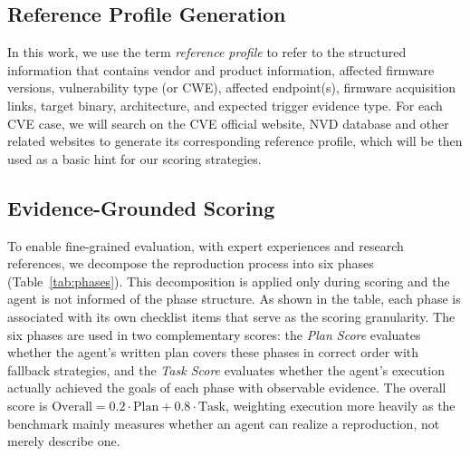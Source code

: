 \subsection{Reference Profile Generation}
\label{sec:dossier}

In this work, we use the term \textit{reference profile} to refer to the
structured information that contains vendor and product information, affected firmware versions, vulnerability type (or CWE), affected endpoint(s), firmware acquisition links, target binary, architecture, and expected trigger evidence type. For each CVE case, we will search on the CVE official website, NVD database and other related websites to generate its corresponding reference profile, which will be then used as a basic hint for our scoring strategies.

\subsection{Evidence-Grounded Scoring}
\label{sec:scoring}
To enable fine-grained evaluation, with expert experiences and research references, we decompose the reproduction process into six phases (Table~\ref{tab:phases}). 
This decomposition is applied only during scoring and the agent is not informed of the phase structure. 
As shown in the table, each phase is associated with its own checklist items that serve as the scoring granularity. 
The six phases are used in two complementary scores: the \emph{Plan Score} evaluates whether the agent's written plan covers these phases in correct order with fallback strategies, and the \emph{Task Score} evaluates whether the agent's execution actually achieved the goals of each phase with observable evidence. The overall score is $\text{Overall}=0.2\cdot\text{Plan}+0.8\cdot\text{Task}$, weighting execution more heavily as the benchmark mainly measures whether an agent can realize a reproduction, not merely describe one.

